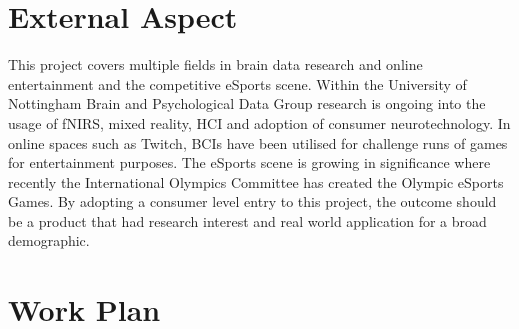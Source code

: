 \documentclass{article}
\begin{document}
\section{External Aspect}
This project covers multiple fields in brain data research and online entertainment and the competitive eSports scene. Within the University of Nottingham Brain and Psychological Data Group research is ongoing into the usage of fNIRS,  mixed reality, HCI and adoption of consumer neurotechnology. In online spaces such as Twitch, BCIs have been utilised for challenge runs of games for entertainment purposes. The eSports scene is growing in significance where recently the International Olympics Committee has created the Olympic eSports Games. By adopting a consumer level entry to this project, the outcome should be a product that had research interest and real world application for a broad demographic.

\section{Work Plan}



\end{document}
